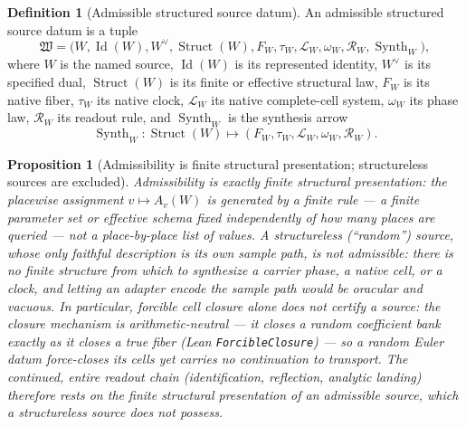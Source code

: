\documentclass[11pt]{article}
\newtheorem{proposition}[theorem]{Proposition}
\theoremstyle{definition}
\newtheorem{definition}[theorem]{Definition}
\begin{document}
\begin{definition}[Admissible structured source datum]\label{def:admissible-structured-source-datum}
An admissible structured source datum is a tuple
\[
\mathfrak W=
\bigl(
W,\operatorname{Id}(W),W^\vee,\operatorname{Struct}(W),
F_W,\tau_W,\mathcal L_W,\omega_W,\mathcal R_W,\operatorname{Synth}_W
\bigr),
\]
where \(W\) is the named source, \(\operatorname{Id}(W)\) is its represented
identity, \(W^\vee\) is its specified dual, \(\operatorname{Struct}(W)\) is its
finite or effective structural law, \(F_W\) is its native fiber, \(\tau_W\) its
native clock, \(\mathcal L_W\) its native complete-cell system, \(\omega_W\)
its phase law, \(\mathcal R_W\) its readout rule, and
\(\operatorname{Synth}_W\) is the synthesis arrow
\[
\operatorname{Synth}_W:
\operatorname{Struct}(W)\longmapsto
(F_W,\tau_W,\mathcal L_W,\omega_W,\mathcal R_W).
\]
\end{definition}

\begin{proposition}[Admissibility is finite structural presentation; structureless sources are excluded]\label{prop:g4-admissibility-random}
Admissibility is \emph{exactly} finite structural presentation: the placewise
assignment \(v\mapsto A_v(W)\) is generated by a finite rule --- a finite
parameter set or effective schema fixed independently of how many places are
queried --- not a place-by-place list of values.  A structureless
(``random'') source, whose only faithful description is its own sample path, is
\emph{not} admissible: there is no finite structure from which to synthesize a
carrier phase, a native cell, or a clock, and letting an adapter encode the
sample path would be oracular and vacuous.  In particular, forcible cell
closure alone does not certify a source: the closure mechanism is
arithmetic-neutral --- it closes a random coefficient bank exactly as it closes
a true fiber (Lean \texttt{ForcibleClosure}) --- so a random Euler datum
force-closes its cells yet carries no continuation to transport.  The continued,
entire readout chain (identification, reflection, analytic landing) therefore
rests on the finite structural presentation
of an admissible source, which a structureless source does not possess.
\end{proposition}
\end{document}
